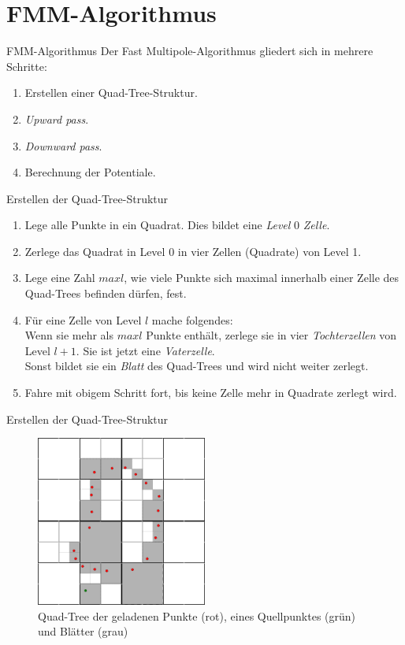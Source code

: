 \documentclass[ngerman]{beamer}
\begin{document}
\section{FMM-Algorithmus}
\begin{frame}{FMM-Algorithmus}
Der Fast Multipole-Algorithmus gliedert sich in mehrere Schritte:
\begin{enumerate}
\item Erstellen einer Quad-Tree-Struktur.
\item \emph{Upward pass}.
\item \emph{Downward pass}.
\item Berechnung der Potentiale.
\end{enumerate}
\end{frame}

\begin{frame}{Erstellen der Quad-Tree-Struktur}
\begin{enumerate}
\item Lege alle Punkte in ein Quadrat. Dies bildet eine \emph{Level} 0 \emph{Zelle}.
\item Zerlege das Quadrat in Level 0 in vier Zellen (Quadrate) von Level 1.
\item Lege eine Zahl $maxl$, wie viele Punkte sich maximal innerhalb einer Zelle des Quad-Trees befinden dürfen, fest.
\item Für eine Zelle von Level $l$ mache folgendes:\\
Wenn sie mehr als $maxl$ Punkte enthält, zerlege sie in vier \emph{Tochterzellen} von Level $l+1$. Sie ist jetzt eine \emph{Vaterzelle}.\\
Sonst bildet sie ein \emph{Blatt} des Quad-Trees und wird nicht weiter zerlegt.
\item Fahre mit obigem Schritt fort, bis keine Zelle mehr in Quadrate zerlegt wird.
\end{enumerate}
\end{frame}

\begin{frame}{Erstellen der Quad-Tree-Struktur}
\begin{figure}
\includegraphics[width=0.5\textwidth]{quadtree.png}
\caption{Quad-Tree der geladenen Punkte (rot), eines Quellpunktes (grün) und Blätter (grau)}
\end{figure}
\end{frame}
\end{document}
